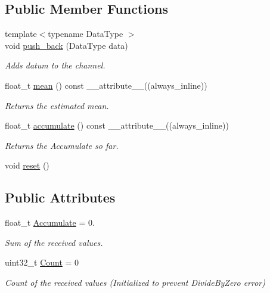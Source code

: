 \subsection*{Public Member Functions}
\begin{DoxyCompactItemize}
\item 
{\footnotesize template$<$typename Data\+Type $>$ }\\void \hyperlink{classMonitorChannel_3_01float__t_00_01true_01_4_a7cbf938f25adc1827fac9efc88e42c90}{push\+\_\+back} (Data\+Type data)
\begin{DoxyCompactList}\small\item\em Adds datum to the channel. \end{DoxyCompactList}\item 
float\+\_\+t \hyperlink{classMonitorChannel_3_01float__t_00_01true_01_4_adcd78d97979f01547d020df57de1228c}{mean} () const \+\_\+\+\_\+attribute\+\_\+\+\_\+((always\+\_\+inline))
\begin{DoxyCompactList}\small\item\em Returns the estimated mean. \end{DoxyCompactList}\item 
float\+\_\+t \hyperlink{classMonitorChannel_3_01float__t_00_01true_01_4_a980a02eba695a4fa8058115c61b08d78}{accumulate} () const \+\_\+\+\_\+attribute\+\_\+\+\_\+((always\+\_\+inline))
\begin{DoxyCompactList}\small\item\em Returns the {\ttfamily Accumulate} so far. \end{DoxyCompactList}\item 
void \hyperlink{classMonitorChannel_3_01float__t_00_01true_01_4_ad3fb6db48e2c334db6230e2062aaa654}{reset} ()
\end{DoxyCompactItemize}
\subsection*{Public Attributes}
\begin{DoxyCompactItemize}
\item 
float\+\_\+t \hyperlink{classMonitorChannel_3_01float__t_00_01true_01_4_ade309c9281e672ec50a1f515d7aee499}{Accumulate} = 0.
\begin{DoxyCompactList}\small\item\em Sum of the received values. \end{DoxyCompactList}\item 
uint32\+\_\+t \hyperlink{classMonitorChannel_3_01float__t_00_01true_01_4_ad62fe4fb25e1877eb23333448ad101d2}{Count} = 0
\begin{DoxyCompactList}\small\item\em Count of the received values (Initialized to prevent Divide\+By\+Zero error) \end{DoxyCompactList}\end{DoxyCompactItemize}


